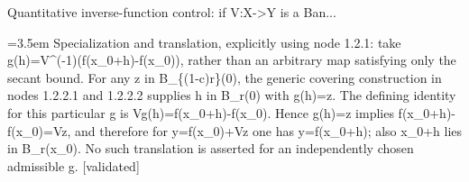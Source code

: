 \documentclass{article}
\newcommand{\step}[1]{\par\noindent\hangindent=3.5em\hangafter=1%
  \makebox[3.5em][l]{\textbf{#1.}}}
\newcommand{\steptag}[1]{\hfill{\small\textsf{[#1]}}}
\begin{document}
\begin{proofbox}{Quantitative inverse-function control: if V:X->Y is a Ban...}
\step{1.2.2.3} Specialization and translation, explicitly using node 1.2.1: take g(h)=V\textasciicircum{}(-1)(f(x\_0+h)-f(x\_0)), rather than an arbitrary map satisfying only the secant bound. For any z in B\_\{(1-c)r\}(0), the generic covering construction in nodes 1.2.2.1 and 1.2.2.2 supplies h in B\_r(0) with g(h)=z. The defining identity for this particular g is Vg(h)=f(x\_0+h)-f(x\_0). Hence g(h)=z implies f(x\_0+h)-f(x\_0)=Vz, and therefore for y=f(x\_0)+Vz one has y=f(x\_0+h); also x\_0+h lies in B\_r(x\_0). No such translation is asserted for an independently chosen admissible g. \steptag{validated} \\[4pt]
\end{proofbox}
\end{document}
